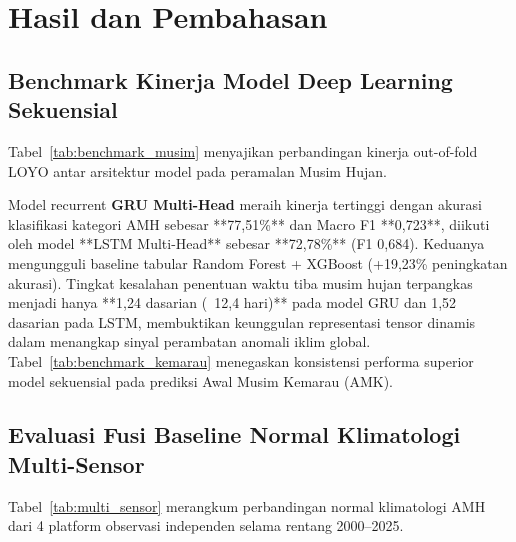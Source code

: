 \documentclass[11pt,a4paper]{article}
\begin{document}
\section{Hasil dan Pembahasan}

\subsection{Benchmark Kinerja Model Deep Learning Sekuensial}
Tabel~\ref{tab:benchmark_musim} menyajikan perbandingan kinerja out-of-fold LOYO antar arsitektur model pada peramalan Musim Hujan.

\begin{table}[H]
\centering
\caption[Benchmark Kinerja Model Musim Hujan]{Hasil Benchmark Komparatif Evaluasi Out-of-Fold Leave-One-Year-Out (LOYO 2000--2025) untuk Prediksi Musim Hujan di Kabupaten Kebumen.}
\label{tab:benchmark_musim}

\end{table}

Model recurrent \textbf{GRU Multi-Head} meraih kinerja tertinggi dengan akurasi klasifikasi kategori AMH sebesar **77,51\%** dan Macro F1 **0,723**, diikuti oleh model **LSTM Multi-Head** sebesar **72,78\%** (F1 0,684). Keduanya mengungguli baseline tabular Random Forest + XGBoost (+19,23\% peningkatan akurasi). Tingkat kesalahan penentuan waktu tiba musim hujan terpangkas menjadi hanya **1,24 dasarian (~12,4 hari)** pada model GRU dan 1,52 dasarian pada LSTM, membuktikan keunggulan representasi tensor dinamis dalam menangkap sinyal perambatan anomali iklim global. Tabel~\ref{tab:benchmark_kemarau} menegaskan konsistensi performa superior model sekuensial pada prediksi Awal Musim Kemarau (AMK).

\begin{table}[H]
\centering
\caption[Benchmark Kinerja Model Musim Kemarau]{Hasil Benchmark Komparatif Evaluasi LOYO untuk Prediksi Musim Kemarau di Kabupaten Kebumen.}
\label{tab:benchmark_kemarau}

\end{table}

\subsection{Evaluasi Fusi Baseline Normal Klimatologi Multi-Sensor}
Tabel~\ref{tab:multi_sensor} merangkum perbandingan normal klimatologi AMH dari 4 platform observasi independen selama rentang 2000--2025.

\begin{table}[H]
\centering
\caption[Komparasi Normal AMH Multi-Sensor]{Komparasi Baseline Normal Klimatologi Awal Musim Hujan Lintas 4 Platform Penginderaan Jauh dan Konsensus Fusi di 26 Kecamatan Kebumen.}
\label{tab:multi_sensor}

\end{table}
\end{document}
